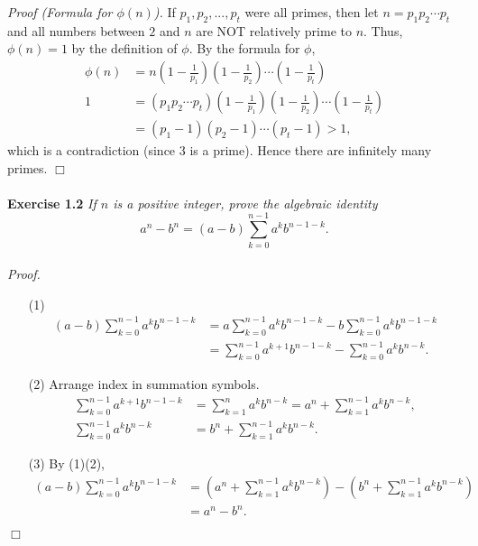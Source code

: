 \documentclass{article}
\begin{document}
\emph{Proof (Formula for $\phi(n)$).}
If
$p_1, p_2, ..., p_t$ were all primes, then let
$n = p_1 p_2 \cdots p_t$ and all numbers between $2$ and $n$ are
NOT relatively prime to $n$.
Thus, $\phi(n) = 1$ by the definition of $\phi$.
By the formula for $\phi$,
\begin{align*}
\phi(n)
&= n
\left( 1 - \frac{1}{p_1} \right)
\left( 1 - \frac{1}{p_2} \right)
\cdots
\left( 1 - \frac{1}{p_t} \right) \\
1
&= (p_1 p_2 \cdots p_t)
\left( 1 - \frac{1}{p_1} \right)
\left( 1 - \frac{1}{p_2} \right)
\cdots
\left( 1 - \frac{1}{p_t} \right) \\
&= (p_1 - 1)(p_2 - 1) \cdots (p_t - 1) > 1,
\end{align*}
which is a contradiction (since $3$ is a prime).
Hence there are infinitely many primes.
$\Box$ \\\\


\textbf{Exercise 1.2}
\emph{If $n$ is a positive integer, prove the algebraic identity
$$a^n - b^n = (a - b) \sum_{k=0}^{n-1} a^k b^{n-1-k}.$$} \\

\emph{Proof.}
\begin{enumerate}
\item[(1)]
\begin{align*}
(a - b) \sum_{k=0}^{n-1} a^k b^{n-1-k}
&= a \sum_{k=0}^{n-1} a^k b^{n-1-k} - b \sum_{k=0}^{n-1} a^k b^{n-1-k} \\
&= \sum_{k=0}^{n-1} a^{k+1} b^{n-1-k} - \sum_{k=0}^{n-1} a^k b^{n-k}.
\end{align*}
\item[(2)] Arrange index in summation symbols.
\begin{align*}
\sum_{k=0}^{n-1} a^{k+1} b^{n-1-k}
&= \sum_{k=1}^{n} a^{k} b^{n-k}
= a^n + \sum_{k=1}^{n-1} a^{k} b^{n-k}, \\
\sum_{k=0}^{n-1} a^k b^{n-k}
&= b^n + \sum_{k=1}^{n-1} a^{k} b^{n-k}.
\end{align*}
\item[(3)]
By (1)(2),
\begin{align*}
(a - b) \sum_{k=0}^{n-1} a^k b^{n-1-k}
&= \left( a^n + \sum_{k=1}^{n-1} a^{k} b^{n-k} \right)
- \left( b^n + \sum_{k=1}^{n-1} a^{k} b^{n-k} \right) \\
&= a^n - b^n.
\end{align*}
\end{enumerate}
$\Box$ \\
\end{document}
